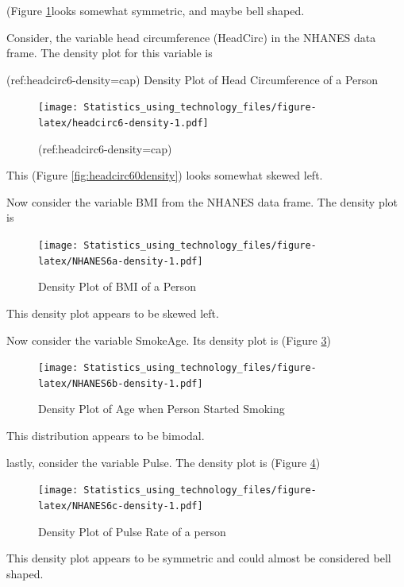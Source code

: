 \documentclass[
]{book}
\begin{document}
(Figure \ref{fig:headcirc6-density}looks somewhat symmetric, and maybe bell shaped.

Consider, the variable head circumference (HeadCirc) in the NHANES data frame. The density plot for this variable is

(ref:headcirc6-density=cap) Density Plot of Head Circumference of a Person

\begin{figure}
\centering
\texttt{[image: Statistics\_using\_technology\_files/figure-latex/headcirc6-density-1.pdf]}
\caption{\label{fig:headcirc6-density}(ref:headcirc6-density=cap)}
\end{figure}

This (Figure \ref{fig:headcirc60density}) looks somewhat skewed left.

Now consider the variable BMI from the NHANES data frame. The density plot is



\begin{figure}
\centering
\texttt{[image: Statistics\_using\_technology\_files/figure-latex/NHANES6a-density-1.pdf]}
\caption{\label{fig:NHANES6a-density}Density Plot of BMI of a Person}
\end{figure}

This density plot appears to be skewed left.

Now consider the variable SmokeAge. Its density plot is (Figure \ref{fig:NHANES6b-density})



\begin{figure}
\centering
\texttt{[image: Statistics\_using\_technology\_files/figure-latex/NHANES6b-density-1.pdf]}
\caption{\label{fig:NHANES6b-density}Density Plot of Age when Person Started Smoking}
\end{figure}

This distribution appears to be bimodal.

lastly, consider the variable Pulse. The density plot is (Figure \ref{fig:NHANES6c-density})



\begin{figure}
\centering
\texttt{[image: Statistics\_using\_technology\_files/figure-latex/NHANES6c-density-1.pdf]}
\caption{\label{fig:NHANES6c-density}Density Plot of Pulse Rate of a person}
\end{figure}

This density plot appears to be symmetric and could almost be considered bell shaped.
\end{document}
